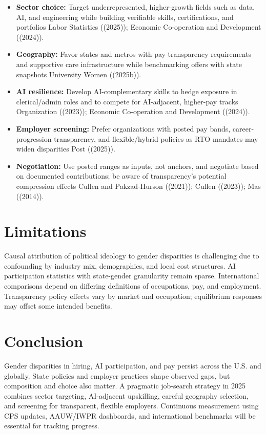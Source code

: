 \documentclass[
  letterpaper,
  DIV=11,
  numbers=noendperiod]{scrartcl}
\providecommand{\tightlist}{%
  \setlength{\itemsep}{0pt}\setlength{\parskip}{0pt}}
\begin{document}
\begin{itemize}
\tightlist
\item
  \textbf{Sector choice:} Target underrepresented, higher-growth fields
  such as data, AI, and engineering while building verifiable skills,
  certifications, and portfolios Labor Statistics ((2025)); Economic
  Co-operation and Development ((2024)).
\item
  \textbf{Geography:} Favor states and metros with pay-transparency
  requirements and supportive care infrastructure while benchmarking
  offers with state snapshots University Women ((2025b)).
\item
  \textbf{AI resilience:} Develop AI-complementary skills to hedge
  exposure in clerical/admin roles and to compete for AI-adjacent,
  higher-pay tracks Organization ((2023)); Economic Co-operation and
  Development ((2024)).
\item
  \textbf{Employer screening:} Prefer organizations with posted pay
  bands, career-progression transparency, and flexible/hybrid policies
  as RTO mandates may widen disparities Post ((2025)).
\item
  \textbf{Negotiation:} Use posted ranges as inputs, not anchors, and
  negotiate based on documented contributions; be aware of
  transparency's potential compression effects Cullen and Pakzad-Hurson
  ((2021)); Cullen ((2023)); Mas ((2014)).
\end{itemize}

\section{Limitations}\label{limitations}

Causal attribution of political ideology to gender disparities is
challenging due to confounding by industry mix, demographics, and local
cost structures. AI participation statistics with state-gender
granularity remain sparse. International comparisons depend on differing
definitions of occupations, pay, and employment. Transparency policy
effects vary by market and occupation; equilibrium responses may offset
some intended benefits.

\section{Conclusion}\label{conclusion}

Gender disparities in hiring, AI participation, and pay persist across
the U.S. and globally. State policies and employer practices shape
observed gaps, but composition and choice also matter. A pragmatic
job-search strategy in 2025 combines sector targeting, AI-adjacent
upskilling, careful geography selection, and screening for transparent,
flexible employers. Continuous measurement using CPS updates, AAUW/IWPR
dashboards, and international benchmarks will be essential for tracking
progress.
\end{document}
